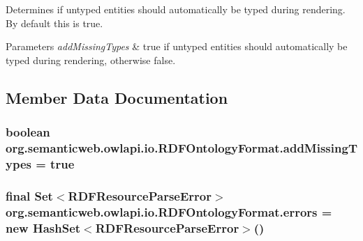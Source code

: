 Determines if untyped entities should automatically be typed during rendering. By default this is true. 
\begin{DoxyParams}{Parameters}
{\em add\-Missing\-Types} & {\ttfamily true} if untyped entities should automatically be typed during rendering, otherwise {\ttfamily false}. \\
\hline
\end{DoxyParams}


\subsection{Member Data Documentation}
\hypertarget{classorg_1_1semanticweb_1_1owlapi_1_1io_1_1_r_d_f_ontology_format_a82a12b94fa937ba1c8c06d548f3e35e3}{
\subsubsection[{add\-Missing\-Types}]{\setlength{\rightskip}{0pt plus 5cm}boolean org.\-semanticweb.\-owlapi.\-io.\-R\-D\-F\-Ontology\-Format.\-add\-Missing\-Types = true\hspace{0.3cm}{\ttfamily [private]}}}\label{classorg_1_1semanticweb_1_1owlapi_1_1io_1_1_r_d_f_ontology_format_a82a12b94fa937ba1c8c06d548f3e35e3}
\hypertarget{classorg_1_1semanticweb_1_1owlapi_1_1io_1_1_r_d_f_ontology_format_a3a44679956bf940dc9e7408adb614a6f}{
\subsubsection[{errors}]{\setlength{\rightskip}{0pt plus 5cm}final Set$<${\bf R\-D\-F\-Resource\-Parse\-Error}$>$ org.\-semanticweb.\-owlapi.\-io.\-R\-D\-F\-Ontology\-Format.\-errors = new Hash\-Set$<${\bf R\-D\-F\-Resource\-Parse\-Error}$>$()\hspace{0.3cm}{\ttfamily [private]}}}\label{classorg_1_1semanticweb_1_1owlapi_1_1io_1_1_r_d_f_ontology_format_a3a44679956bf940dc9e7408adb614a6f}
